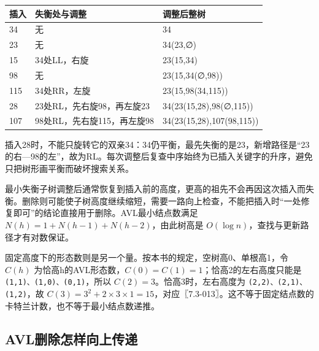 \begin{wideblock}

\par\medskip\noindent\begin{minipage}{\linewidth}\fontsize{9.3}{12}\selectfont\begin{tabularx}{\linewidth}{@{}YYY@{}}
\toprule\noalign{}
插入 & 失衡处与调整 & 调整后整树 \\
\midrule\noalign{}


34 & 无 & 34 \\
23 & 无 & 34(23,∅) \\
15 & 34处LL，右旋 & 23(15,34) \\
98 & 无 & 23(15,34(∅,98)) \\
115 & 34处RR，左旋 & 23(15,98(34,115)) \\
28 & 23处RL，先右旋98，再左旋23 & 34(23(15,28),98(∅,115)) \\
107 & 98处RL，先右旋115，再左旋98 & 34(23(15,28),107(98,115)) \\
\bottomrule\end{tabularx}
\end{minipage}\par\medskip

\end{wideblock}

插入28时，不能只旋转它的双亲34：34仍平衡，最先失衡的是23，新增路径是``23的右---98的左''，故为RL。每次调整后复查中序始终为已插入关键字的升序，避免只把树形画平衡而破坏搜索关系。

最小失衡子树调整后通常恢复到插入前的高度，更高的祖先不会再因这次插入而失衡。删除则可能使子树高度继续缩短，需要一路向上检查，不能把插入时``一处修复即可''的结论直接用于删除。AVL最小结点数满足 \(N(h)=1+N(h-1)+N(h-2)\)，由此树高是 \(O(\log n)\)，查找与更新路径才有对数保证。

固定高度下的形态数则是另一个量。按本书的规定，空树高0、单根高1，令 \(C(h)\) 为恰高h的AVL形态数，\(C(0)=C(1)=1\)；恰高2的左右高度只能是 \texttt{(\allowbreak{}1,\allowbreak{}1)\allowbreak{}、(\allowbreak{}1,\allowbreak{}0)\allowbreak{}、(\allowbreak{}0,\allowbreak{}1)\allowbreak{}}，所以 \(C(2)=3\)。恰高3时，左右高度为 \texttt{(\allowbreak{}2,\allowbreak{}2)\allowbreak{}、(\allowbreak{}2,\allowbreak{}1)\allowbreak{}、(\allowbreak{}1,\allowbreak{}2)\allowbreak{}}，故 \(C(3)=3^2+2\times3\times1=15\)，对应〖7.3-013〗。这不等于固定结点数的卡特兰计数，也不等于最小结点数递推。

\subsection{AVL删除怎样向上传递}\label{DS07-avl-delete}

